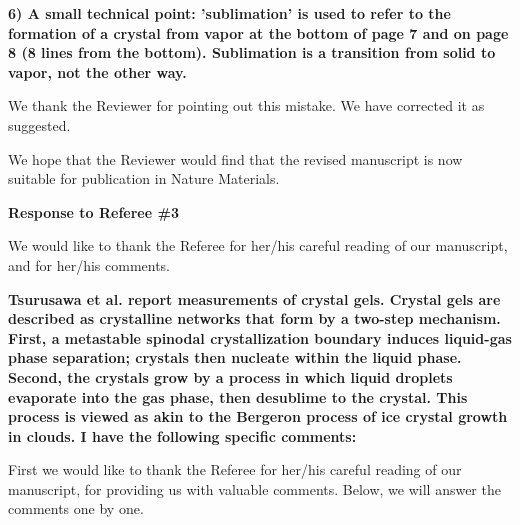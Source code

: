 \documentclass[11pt]{article}
\begin{document}
\vspace{1em}

\singlespacing

{\bf
6) A small technical point: 'sublimation' is used to refer to the formation of a crystal from vapor at the bottom of page 7 and on page 8 (8 lines from the bottom). Sublimation is a transition from solid to vapor, not the other way.
}



\bigskip
\doublespacing

We thank the Reviewer for pointing out this mistake. We have corrected it as suggested. 


We hope that the Reviewer would find that the revised manuscript is now suitable for publication in Nature Materials. 


\clearpage

\noindent
\begin{Large}
{\bf Response to Referee \#3}
\end{Large}


We would like to thank the Referee for her/his careful reading of our
manuscript, and for her/his comments.

\vspace{1em}

\singlespacing

{\bf
Tsurusawa et al. report measurements of crystal gels. Crystal gels are described as crystalline networks that form by a two-step mechanism. First, a metastable spinodal crystallization boundary induces liquid-gas phase separation; crystals then nucleate within the liquid phase. Second, the crystals grow by a process in which liquid droplets evaporate into the gas phase, then desublime to the crystal. This process is viewed as akin to the Bergeron process of ice crystal growth in clouds. I have the following specific comments:
}



\bigskip
\doublespacing


First we would like to thank the Referee for her/his careful reading of our manuscript, for providing us with valuable comments. Below, we will answer the comments one by one. 


\vspace{1em}

\singlespacing
\end{document}
